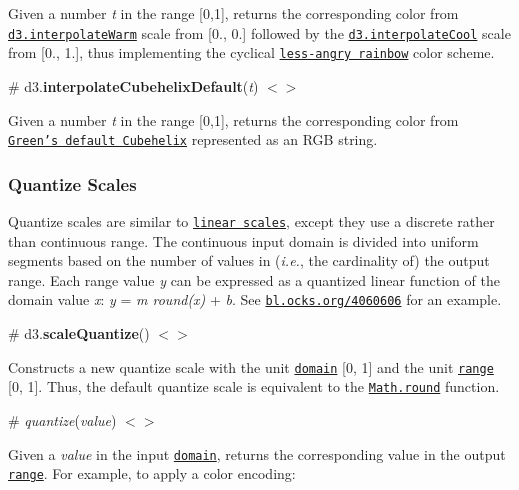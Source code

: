 Given a number {\itshape t} in the range \mbox{[}0,1\mbox{]}, returns the corresponding color from \href{#interpolateWarm}{\tt d3.\+interpolate\+Warm} scale from \mbox{[}0., 0.\mbox{]} followed by the \href{#interpolateCool}{\tt d3.\+interpolate\+Cool} scale from \mbox{[}0., 1.\mbox{]}, thus implementing the cyclical \href{http://bl.ocks.org/mbostock/310c99e53880faec2434}{\tt less-\/angry rainbow} color scheme.

\label{_interpolateCubehelixDefault}%
\# d3.{\bfseries interpolate\+Cubehelix\+Default}({\itshape t}) \href{https://github.com/d3/d3-scale/blob/master/src/cubehelix.js}{\tt $<$$>$}



Given a number {\itshape t} in the range \mbox{[}0,1\mbox{]}, returns the corresponding color from \href{https://www.mrao.cam.ac.uk/~dag/CUBEHELIX/}{\tt Green’s default Cubehelix} represented as an R\+GB string.

\subsubsection*{Quantize Scales}

Quantize scales are similar to \href{#linear-scales}{\tt linear scales}, except they use a discrete rather than continuous range. The continuous input domain is divided into uniform segments based on the number of values in ({\itshape i.\+e.}, the cardinality of) the output range. Each range value {\itshape y} can be expressed as a quantized linear function of the domain value {\itshape x}\+: {\itshape y} = {\itshape m round(x)} + {\itshape b}. See \href{http://bl.ocks.org/mbostock/4060606}{\tt bl.\+ocks.\+org/4060606} for an example.

\label{_scaleQuantize}%
\# d3.{\bfseries scale\+Quantize}() \href{https://github.com/d3/d3-scale/blob/master/src/quantize.js}{\tt $<$$>$}

Constructs a new quantize scale with the unit \href{#quantize_domain}{\tt domain} \mbox{[}0, 1\mbox{]} and the unit \href{#quantize_range}{\tt range} \mbox{[}0, 1\mbox{]}. Thus, the default quantize scale is equivalent to the \href{https://developer.mozilla.org/en/JavaScript/Reference/Global_Objects/Math/round}{\tt Math.\+round} function.

\label{__quantize}%
\# {\itshape quantize}({\itshape value}) \href{https://github.com/d3/d3-scale/blob/master/src/quantize.js#L5}{\tt $<$$>$}

Given a {\itshape value} in the input \href{#quantize_domain}{\tt domain}, returns the corresponding value in the output \href{#quantize_range}{\tt range}. For example, to apply a color encoding\+:


